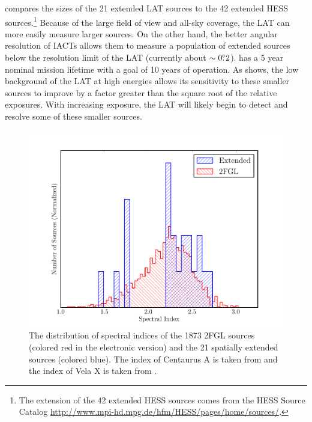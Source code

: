  compares the sizes of the 21 extended LAT
sources to the 42 extended \ac{HESS} sources.\footnote{The \tev extension
of the 42 extended \ac{HESS} sources comes from the \ac{HESS} Source
Catalog \url{http://www.mpi-hd.mpg.de/hfm/HESS/pages/home/sources/}.}
Because of the large field of view and all-sky coverage, the LAT can
more easily measure larger sources.  On the other hand, the better
angular resolution of \acp{IACT} allows them to measure a population
of extended sources below the resolution limit of the LAT (currently
about $\sim0\mbox{$.\!\!^\circ$}2$).  \fermi has a 5 year nominal mission lifetime with
a goal of 10 years of operation.  As  shows,
the low background of the LAT at high energies allows its sensitivity
to these smaller sources to improve by a factor greater than the square
root of the relative exposures.  With increasing exposure, the LAT will
likely begin to detect and resolve some of these smaller \tev sources.

\begin{figure}[htbp]
  \includegraphics{chapters/extended_search/figures/summary_plots/compare_index_2FGL_color.pdf}
  \caption{The distribution of spectral indices of the 1873 2FGL sources
  (colored red in the electronic version) and the 21 spatially extended
  sources (colored blue).  The index of Centaurus A is taken from
  \cite{nolan_2012_fermi-large} and the index of Vela X is taken from
  \cite{abdo_2010c_fermi-large}.}
\end{figure}

